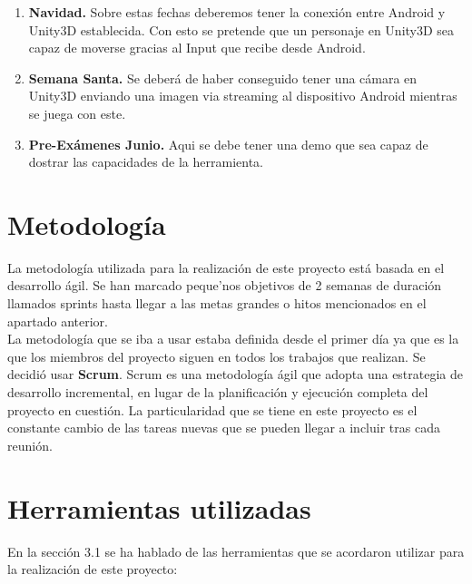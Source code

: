  
\begin{enumerate}

\item \textbf{Navidad.} Sobre estas fechas deberemos tener la conexi\'on entre Android y Unity3D establecida. Con esto se pretende que un personaje en Unity3D sea capaz de moverse gracias al Input que recibe desde Android.
\item \textbf{Semana Santa.} Se deber\'a de haber conseguido tener una c\'amara en Unity3D enviando una imagen via streaming al dispositivo Android mientras se juega con este.
\item \textbf{Pre-Ex\'amenes Junio.} Aqui se debe tener una demo que sea capaz de dostrar las capacidades de la herramienta.

\end{enumerate}



\section{Metodolog\'ia}
\label{cap3:sec:metodolog\'ia}

La metodolog\'ia utilizada para la realizaci\'on de este proyecto est\'a basada en el desarrollo \'agil. Se han marcado peque'nos objetivos de 2 semanas de duraci\'on llamados sprints hasta llegar a las metas grandes o hitos mencionados en el apartado anterior.\\
La metodolog\'ia que se iba a usar estaba definida desde el primer d\'ia ya que es la que los miembros del proyecto siguen en todos los trabajos que realizan. Se decidi\'o usar \textbf{Scrum}.
Scrum es una metodolog\'ia \'agil que adopta una estrategia de desarrollo incremental, en lugar de la planificaci\'on y ejecuci\'on completa del proyecto en cuesti\'on. La particularidad que se tiene en este proyecto es el constante cambio de las tareas nuevas que se pueden llegar a incluir tras cada reuni\'on.

\section{Herramientas utilizadas}
\label{cap3:sec:herramientas}

En la secci\'on 3.1 se ha hablado de las herramientas que se acordaron utilizar para la realizaci\'on de este proyecto:

